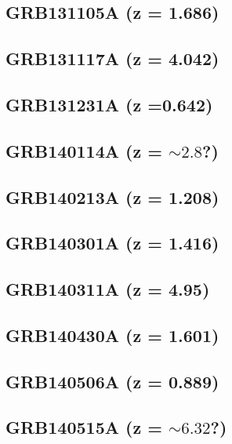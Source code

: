 \documentclass{aa}    %
\begin{document}
\subsection{GRB131105A (z = 1.686)}	




\subsection{GRB131117A (z = 4.042)}	




\subsection{GRB131231A (z =0.642)}	



\subsection{GRB140114A (z = $\sim2.8$?)}	



\subsection{GRB140213A (z = 1.208)}	



\subsection{GRB140301A (z = 1.416)}	



\subsection{GRB140311A (z = 4.95)}	



\subsection{GRB140430A (z = 1.601)}	



\subsection{GRB140506A  (z = 0.889)}	



\subsection{GRB140515A (z = $\sim6.32$?)}	
\end{document}
